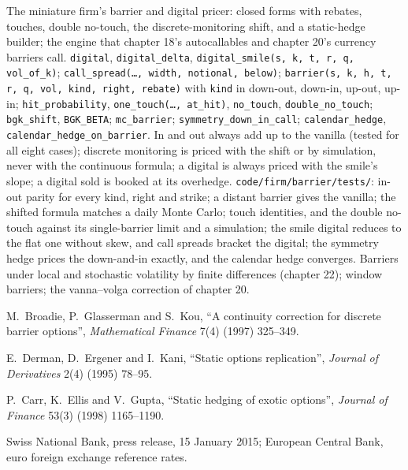 \begin{build}
 The miniature firm's barrier and digital pricer: closed forms with rebates, touches, double no-touch,
the discrete-monitoring shift, and a static-hedge builder; the engine that chapter 18's autocallables and chapter 20's
currency barriers call.
 \texttt{digital}, \texttt{digital\_delta}, \texttt{digital\_smile(s, k, t, r, q, vol\_of\_k)};
\texttt{call\_spread(\ldots, width, notional, below)}; \texttt{barrier(s, k, h, t, r, q, vol, kind, right, rebate)} with
\texttt{kind} in down-out, down-in, up-out, up-in; \texttt{hit\_probability}, \texttt{one\_touch(\ldots, at\_hit)},
\texttt{no\_touch}, \texttt{double\_no\_touch}; \texttt{bgk\_shift}, \texttt{BGK\_BETA}; \texttt{mc\_barrier};
\texttt{symmetry\_down\_in\_call}; \texttt{calendar\_hedge}, \texttt{calendar\_hedge\_on\_barrier}.
 In and out always add up to the vanilla (tested for all eight cases); discrete monitoring is priced with
the shift or by simulation, never with the continuous formula; a digital is always priced with the smile's slope; a
digital sold is booked at its overhedge.
 \texttt{code/firm/barrier/tests/}: in-out parity for every kind, right and strike; a distant
barrier gives the vanilla; the shifted formula matches a daily Monte Carlo; touch identities, and the double no-touch
against its single-barrier limit and a simulation; the smile digital reduces to the flat one without skew, and call
spreads bracket the digital; the symmetry hedge prices the down-and-in exactly, and the calendar hedge converges.
 Barriers under local and stochastic volatility by finite differences (chapter 22); window barriers;
the vanna--volga correction of chapter 20.
\end{build}

\begin{omsources}
\item M.~Broadie, P.~Glasserman and S.~Kou, ``A continuity correction for discrete barrier options'', \emph{Mathematical
Finance} 7(4) (1997) 325--349.
\item E.~Derman, D.~Ergener and I.~Kani, ``Static options replication'', \emph{Journal of Derivatives} 2(4) (1995) 78--95.
\item P.~Carr, K.~Ellis and V.~Gupta, ``Static hedging of exotic options'', \emph{Journal of Finance} 53(3) (1998)
1165--1190.
\item Swiss National Bank, press release, 15 January 2015; European Central Bank, euro foreign exchange reference rates.
\end{omsources}

